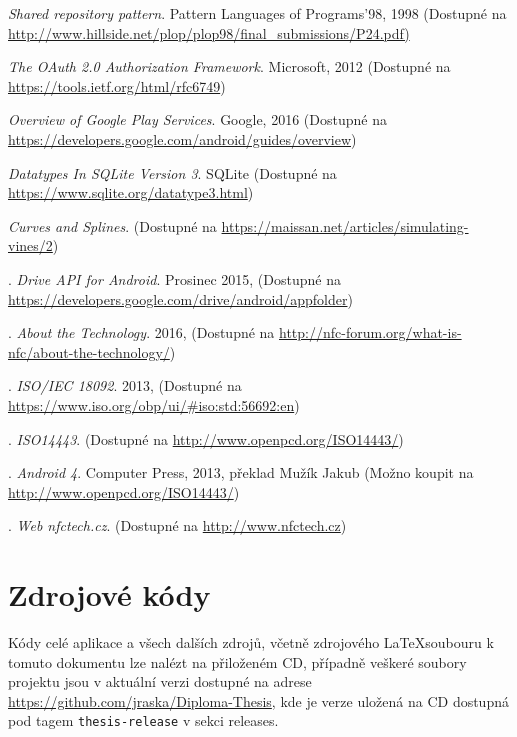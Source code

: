 \documentclass[czech,master,public,dept460,male,java,cpdeclaration]{diploma}
\begin{document}
\begin{thebibliography}{99}
\textit{Shared repository pattern}. {Pattern Languages of Programs'98, 1998}
\newline(Dostupné na \url{http://www.hillside.net/plop/plop98/final_submissions/P24.pdf)}

\textit{The OAuth 2.0 Authorization Framework}. {Microsoft, 2012
\newline(Dostupné na \url{https://tools.ietf.org/html/rfc6749})}

\textit{Overview of Google Play Services}. {Google, 2016
\newline(Dostupné na \url{https://developers.google.com/android/guides/overview})}

\textit{Datatypes In SQLite Version 3}. {SQLite
\newline(Dostupné na \url{https://www.sqlite.org/datatype3.html})}


\textit{Curves and Splines}.
\newline(Dostupné na \url{https://maissan.net/articles/simulating-vines/2})



.
\textit{Drive API for Android}. {Prosinec 2015,
\newline(Dostupné na \url{https://developers.google.com/drive/android/appfolder})}

.
\textit{About the Technology}. {2016,
\newline(Dostupné na \url{http://nfc-forum.org/what-is-nfc/about-the-technology/})}

.
\textit{ISO/IEC 18092}. {2013,
\newline(Dostupné na \url{https://www.iso.org/obp/ui/#iso:std:56692:en})}


.
\textit{ISO14443}. {
\newline(Dostupné na \url{http://www.openpcd.org/ISO14443/})}

.
\textit{Android 4}. {Computer Press, 2013, překlad Mužík Jakub
\newline(Možno koupit na \url{http://www.openpcd.org/ISO14443/})}

.
\textit{Web nfctech.cz}. {
\newline(Dostupné na \url{http://www.nfctech.cz})}

\end{thebibliography}

  \appendix

  \section{Zdrojové kódy}
  Kódy celé aplikace a všech dalších zdrojů, včetně zdrojového \LaTeX soubouru k tomuto dokumentu
   lze nalézt na přiloženém CD, případně veškeré soubory
  projektu jsou v aktuální verzi dostupné na adrese \url{https://github.com/jraska/Diploma-Thesis},
  kde je verze uložená na CD dostupná pod tagem \texttt{thesis-release} v sekci releases.
\end{document}
